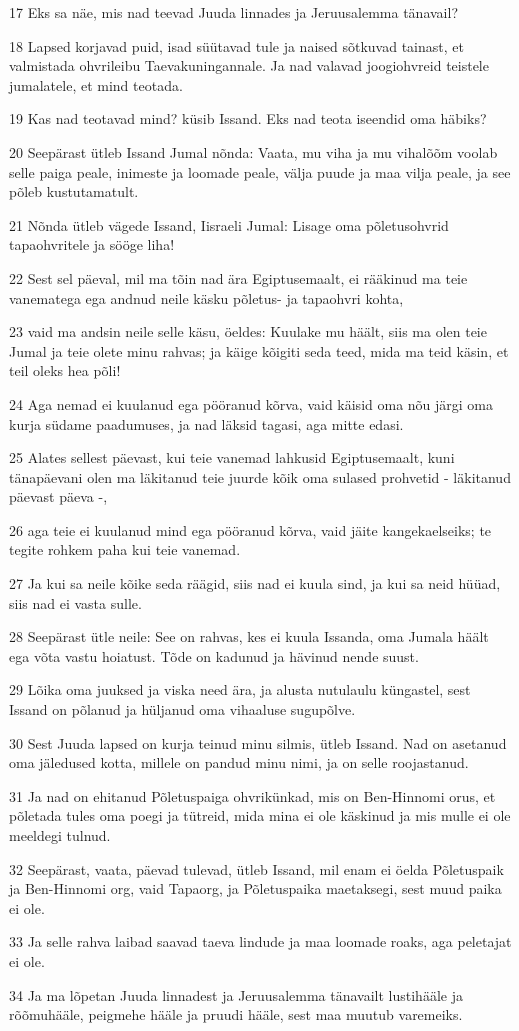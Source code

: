\par 17 Eks sa näe, mis nad teevad Juuda linnades ja Jeruusalemma tänavail?
\par 18 Lapsed korjavad puid, isad süütavad tule ja naised sõtkuvad tainast, et valmistada ohvrileibu Taevakuningannale. Ja nad valavad joogiohvreid teistele jumalatele, et mind teotada.
\par 19 Kas nad teotavad mind? küsib Issand. Eks nad teota iseendid oma häbiks?
\par 20 Seepärast ütleb Issand Jumal nõnda: Vaata, mu viha ja mu vihalõõm voolab selle paiga peale, inimeste ja loomade peale, välja puude ja maa vilja peale, ja see põleb kustutamatult.
\par 21 Nõnda ütleb vägede Issand, Iisraeli Jumal: Lisage oma põletusohvrid tapaohvritele ja sööge liha!
\par 22 Sest sel päeval, mil ma tõin nad ära Egiptusemaalt, ei rääkinud ma teie vanematega ega andnud neile käsku põletus- ja tapaohvri kohta,
\par 23 vaid ma andsin neile selle käsu, öeldes: Kuulake mu häält, siis ma olen teie Jumal ja teie olete minu rahvas; ja käige kõigiti seda teed, mida ma teid käsin, et teil oleks hea põli!
\par 24 Aga nemad ei kuulanud ega pööranud kõrva, vaid käisid oma nõu järgi oma kurja südame paadumuses, ja nad läksid tagasi, aga mitte edasi.
\par 25 Alates sellest päevast, kui teie vanemad lahkusid Egiptusemaalt, kuni tänapäevani olen ma läkitanud teie juurde kõik oma sulased prohvetid - läkitanud päevast päeva -,
\par 26 aga teie ei kuulanud mind ega pööranud kõrva, vaid jäite kangekaelseiks; te tegite rohkem paha kui teie vanemad.
\par 27 Ja kui sa neile kõike seda räägid, siis nad ei kuula sind, ja kui sa neid hüüad, siis nad ei vasta sulle.
\par 28 Seepärast ütle neile: See on rahvas, kes ei kuula Issanda, oma Jumala häält ega võta vastu hoiatust. Tõde on kadunud ja hävinud nende suust.
\par 29 Lõika oma juuksed ja viska need ära, ja alusta nutulaulu küngastel, sest Issand on põlanud ja hüljanud oma vihaaluse sugupõlve.
\par 30 Sest Juuda lapsed on kurja teinud minu silmis, ütleb Issand. Nad on asetanud oma jäledused kotta, millele on pandud minu nimi, ja on selle roojastanud.
\par 31 Ja nad on ehitanud Põletuspaiga ohvrikünkad, mis on Ben-Hinnomi orus, et põletada tules oma poegi ja tütreid, mida mina ei ole käskinud ja mis mulle ei ole meeldegi tulnud.
\par 32 Seepärast, vaata, päevad tulevad, ütleb Issand, mil enam ei öelda Põletuspaik ja Ben-Hinnomi org, vaid Tapaorg, ja Põletuspaika maetaksegi, sest muud paika ei ole.
\par 33 Ja selle rahva laibad saavad taeva lindude ja maa loomade roaks, aga peletajat ei ole.
\par 34 Ja ma lõpetan Juuda linnadest ja Jeruusalemma tänavailt lustihääle ja rõõmuhääle, peigmehe hääle ja pruudi hääle, sest maa muutub varemeiks.

